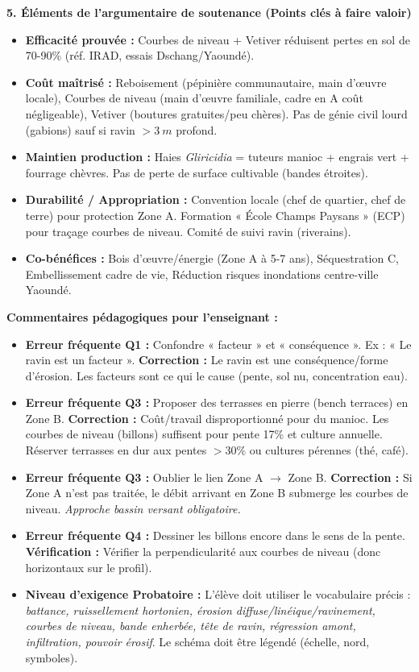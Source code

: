 \documentclass[11pt]{article}
\begin{document}
\begin{exoresolu}
\noindent\textbf{5. Éléments de l'argumentaire de soutenance (Points clés à faire valoir)}
\begin{itemize}
    \item \textbf{Efficacité prouvée :} Courbes de niveau + Vetiver réduisent pertes en sol de 70-90\% (réf. IRAD, essais Dschang/Yaoundé).
    \item \textbf{Coût maîtrisé :} Reboisement (pépinière communautaire, main d'œuvre locale), Courbes de niveau (main d'œuvre familiale, cadre en A coût négligeable), Vetiver (boutures gratuites/peu chères). Pas de génie civil lourd (gabions) sauf si ravin $> \SI{3}{m}$ profond.
    \item \textbf{Maintien production :} Haies \emph{Gliricidia} = tuteurs manioc + engrais vert + fourrage chèvres. Pas de perte de surface cultivable (bandes étroites).
    \item \textbf{Durabilité / Appropriation :} Convention locale (chef de quartier, chef de terre) pour protection Zone A. Formation « École Champs Paysans » (ECP) pour traçage courbes de niveau. Comité de suivi ravin (riverains).
    \item \textbf{Co-bénéfices :} Bois d'œuvre/énergie (Zone A à 5-7 ans), Séquestration C, Embellissement cadre de vie, Réduction risques inondations centre-ville Yaoundé.
\end{itemize}
\tcblower
\textbf{Commentaires pédagogiques pour l'enseignant :}
\begin{itemize}
    \item \textbf{Erreur fréquente Q1 :} Confondre « facteur » et « conséquence ». Ex : « Le ravin est un facteur ». \textbf{Correction :} Le ravin est une conséquence/forme d'érosion. Les facteurs sont ce qui le cause (pente, sol nu, concentration eau).
    \item \textbf{Erreur fréquente Q3 :} Proposer des terrasses en pierre (bench terraces) en Zone B. \textbf{Correction :} Coût/travail disproportionné pour du manioc. Les courbes de niveau (billons) suffisent pour pente 17\% et culture annuelle. Réserver terrasses en dur aux pentes $> 30\%$ ou cultures pérennes (thé, café).
    \item \textbf{Erreur fréquente Q3 :} Oublier le lien Zone A $\rightarrow$ Zone B. \textbf{Correction :} Si Zone A n'est pas traitée, le débit arrivant en Zone B submerge les courbes de niveau. \textit{Approche bassin versant obligatoire.}
    \item \textbf{Erreur fréquente Q4 :} Dessiner les billons encore dans le sens de la pente. \textbf{Vérification :} Vérifier la perpendicularité aux courbes de niveau (donc horizontaux sur le profil).
    \item \textbf{Niveau d'exigence Probatoire :} L'élève doit utiliser le vocabulaire précis : \emph{battance, ruissellement hortonien, érosion diffuse/linéique/ravinement, courbes de niveau, bande enherbée, tête de ravin, régression amont, infiltration, pouvoir érosif}. Le schéma doit être légendé (échelle, nord, symboles).
\end{itemize}
\end{exoresolu}
\end{document}
